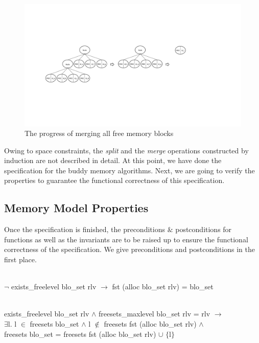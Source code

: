\documentclass[runningheads]{llncs}
\begin{document}
\begin{figure}
\centering
\includegraphics[width=1\textwidth]{fig2.pdf}
\caption{The progress of merging all free memory blocks}
\label{fig2}
\end{figure}

Owing to space constraints, the \emph{split} and the \emph{merge} operations constructed by induction are not described in detail. At this point, we have done the specification for the buddy memory algorithms. Next, we are going to verify the properties to guarantee the functional correctness of this specification.


\subsection{Memory Model Properties}
Once the specification is finished, the preconditions $\&$ postconditions for functions as well as the invariants are to be raised up to ensure the functional correctness of the specification. We give preconditions and postconditions in the first place.

\begin{definition}  \\
$\neg$ exists\_freelevel blo\_set rlv $\longrightarrow$ fst (alloc blo\_set rlv) = blo\_set
\label{pp1}
\end{definition}

\begin{definition}  \\
exists\_freelevel blo\_set rlv $\wedge$ freesets\_maxlevel blo\_set rlv = rlv $\longrightarrow$ \\
\phantom{x} \hspace{10pt} $\exists$l. l $\in$ freesets blo\_set $\wedge$ l $\notin$ freesets fst (alloc blo\_set rlv) $\wedge$ \\
\phantom{x} \hspace{10pt} freesets blo\_set = freesets fst (alloc blo\_set rlv) $\cup$ $\lbrace$l$\rbrace$
\label{pp2}
\end{definition}
\end{document}
